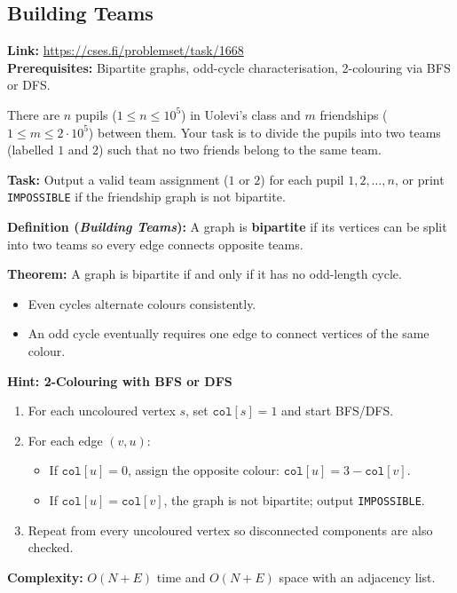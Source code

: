 \documentclass[12pt]{article}
\begin{document}
\subsection{Building Teams}
\textbf{Link:} \url{https://cses.fi/problemset/task/1668} \\
\textbf{Prerequisites:} Bipartite graphs, odd-cycle characterisation, 2-colouring via BFS or DFS.

There are $n$ pupils ($1 \le n \le 10^5$) in Uolevi's class and $m$ friendships ($1 \le m \le 2 \cdot 10^5$) between them. Your task is to divide the pupils into two teams (labelled $1$ and $2$) such that no two friends belong to the same team.

\textbf{Task:} Output a valid team assignment ($1$ or $2$) for each pupil $1, 2, \dots, n$, or print \texttt{IMPOSSIBLE} if the friendship graph is not bipartite.

\textbf{Definition (\emph{Building Teams}):} A graph is \textbf{bipartite} if its vertices can be split into two teams so every edge connects opposite teams.

\textbf{Theorem:} A graph is bipartite if and only if it has no odd-length cycle.
\begin{itemize}
    \item Even cycles alternate colours consistently.
    \item An odd cycle eventually requires one edge to connect vertices of the same colour.
\end{itemize}

\textbf{Hint: 2-Colouring with BFS or DFS}

\begin{enumerate}
    \item For each uncoloured vertex $s$, set $\texttt{col}[s]=1$ and start BFS/DFS.
    \item For each edge $(v,u)$:
      \begin{itemize}
        \item If $\texttt{col}[u]=0$, assign the opposite colour: $\texttt{col}[u]=3-\texttt{col}[v]$.
        \item If $\texttt{col}[u]=\texttt{col}[v]$, the graph is not bipartite; output \texttt{IMPOSSIBLE}.
      \end{itemize}
    \item Repeat from every uncoloured vertex so disconnected components are also checked.
\end{enumerate}
\textbf{Complexity:} $O(N+E)$ time and $O(N+E)$ space with an adjacency list.
\end{document}
